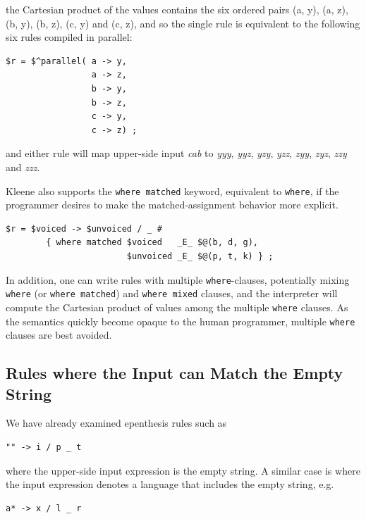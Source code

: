 \noindent
the Cartesian product of the values contains the six ordered pairs (a, y), (a, z), (b, y), (b, z), (c, y) and (c, z), and so
the single rule is equivalent to the following six rules compiled in parallel:

\begin{Verbatim}
$r = $^parallel( a -> y, 
                 a -> z, 
                 b -> y, 
                 b -> z, 
                 c -> y, 
                 c -> z) ;
\end{Verbatim}

\noindent
and either rule will map upper-side input \emph{cab} to \emph{yyy}, \emph{yyz}, \emph{yzy}, \emph{yzz}, \emph{zyy}, \emph{zyz},
\emph{zzy} and \emph{zzz}.


Kleene also supports the \texttt{where matched} keyword, equivalent to \texttt{where}, if the
programmer desires to make the matched-assignment behavior more explicit.

\begin{Verbatim}
$r = $voiced -> $unvoiced / _ #
        { where matched $voiced   _E_ $@(b, d, g), 
                        $unvoiced _E_ $@(p, t, k) } ;
\end{Verbatim}

\noindent
In addition, one can write rules with multiple \texttt{where}-clauses, potentially mixing \texttt{where} (or
\texttt{where matched}) and \texttt{where mixed} clauses, and the interpreter will compute the Cartesian product of values
among the multiple \texttt{where} clauses.  As the semantics quickly become opaque to the human programmer, multiple
\texttt{where} clauses are best avoided.

\subsection{Rules where the Input can Match the Empty String}

We have already examined epenthesis rules such as

\begin{Verbatim}
"" -> i / p _ t
\end{Verbatim}

\noindent
where the upper-side input expression is the empty string.  A similar case is where the input expression denotes a
language that includes the empty string, e.g.

\begin{Verbatim}
a* -> x / l _ r
\end{Verbatim}


